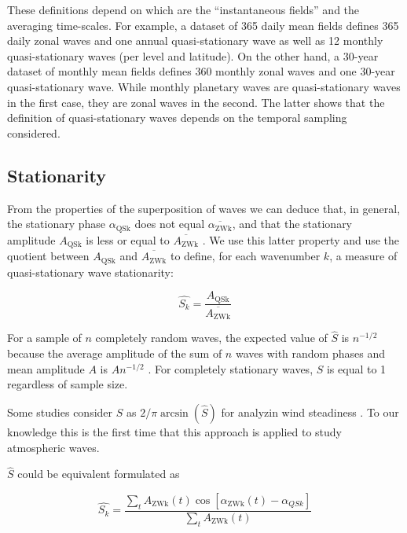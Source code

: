 \documentclass[draft,linenumbers]{agujournal2018}
\begin{document}
These definitions depend on which are the ``instantaneous fields'' and
the averaging time-scales. For example, a dataset of 365 daily mean
fields defines 365 daily zonal waves and one annual quasi-stationary
wave as well as 12 monthly quasi-stationary waves (per level and
latitude). On the other hand, a 30-year dataset of monthly mean fields
defines 360 monthly zonal waves and one 30-year quasi-stationary wave.
While monthly planetary waves are quasi-stationary waves in the first
case, they are zonal waves in the second. The latter shows that the
definition of quasi-stationary waves depends on the temporal sampling
considered.

\subsection{Stationarity}

From the properties of the superposition of waves we can deduce that, in
general, the stationary phase \(\alpha_\mathrm{QSk}\) does not equal
\(\overline{\alpha_\mathrm{ZWk}}\), and that the stationary amplitude
\(A_\mathrm{QSk}\) is less or equal to \(\overline{A_\mathrm{ZWk}}\)
\citep{pain2005}. We use this latter property and use the quotient
between \(A_\mathrm{QSk}\) and \(\overline{A_\mathrm{ZWk}}\) to define,
for each wavenumber \(k\), a measure of quasi-stationary wave
stationarity:

\begin{linenomath*}
\begin{equation}\label{eq:S}
\hat{S_k} = \frac{A_\mathrm{QSk}}{\overline{A_\mathrm{ZWk}}}
\end{equation}
\end{linenomath*}

For a sample of \(n\) completely random waves, the expected value of
\(\hat{S}\) is \(n^{-1/2}\) because the average amplitude of the sum of
\(n\) waves with random phases and mean amplitude \(A\) is \(An^{-1/2}\)
\citep{pain2005}. For completely stationary waves, \(\hat{S}\) is equal
to 1 regardless of sample size.

Some studies consider \(\hat{S}\) as
\(2/\pi\arcsin \left (\hat{S} \right )\) \citep{singer1967} for analyzin
wind steadiness \citep[e.g][]{hiscox2010}. To our knowledge this is the
first time that this approach is applied to study atmospheric waves.

\(\hat{S}\) could be equivalent formulated as

\begin{linenomath*}
\begin{equation}\label{eq:S2}
\hat{S_k} =   \frac{\sum_t A_\mathrm{ZWk}(t) \cos  \left [\alpha_\mathrm{ZWk}(t) - \alpha_{QSk} \right ]}{\sum_t A_\mathrm{ZWk}(t)}
\end{equation}
\end{linenomath*}
\end{document}
